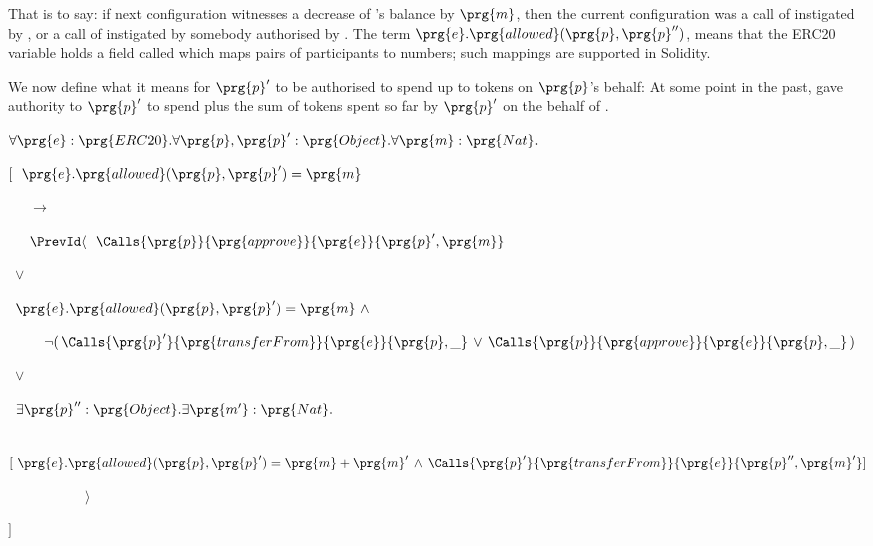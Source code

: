 \noindent
That is to say: if next configuration witnesses a decrease of 's balance by
 $\prg{m}$, then the current configuration was a call of  instigated by
 , or  a call of  instigated by somebody authorised by .
 The term $\prg{e}.\prg{allowed}(\prg{p},\prg{p}'')$,  means that the
ERC20 variable  holds a field called    which maps pairs of participants to numbers; such
mappings are supported in Solidity\cite{Solidity}.
 
We now define what it means for $\prg{p}'$ to be authorised  to  spend 
up to  tokens on  $\prg{p}$'s behalf: At some point in the
past,   gave authority to $\prg{p}'$  to spend   
plus the sum of  tokens
spent so far by $\prg{p}' $ on the behalf of . 

 
\vspace{.15cm}
\noindent
 $\forall \prg{e}:\prg{ERC20}.\forall \prg{p},\prg{p}^\prime:\prg{Object}.\forall \prg{m}:\prg{Nat}.$\\
\strut \hspace{0.3cm} $[\ \ \prg{e}.\prg{allowed}(\prg{p},\prg{p}')=\prg{m} $\\
\strut \hspace{0.4cm} \ \ \ $\longrightarrow$\\
\strut \hspace{0.4cm} \ \ \  
     $\PrevId\langle\ \  \Calls{\prg{p}}  {\prg{approve}}  {\prg{e}} {\prg{p}',\prg{m}} $\\
      \strut \hspace{1.7cm} \ $\vee $\\
\strut \hspace{1.7cm} \  
     $    \prg{e}.\prg{allowed}(\prg{p},\prg{p}')=\prg{m}   
        \  \wedge\ $\\
\strut \hspace{1.5cm} \ \ \ \ \          
$  \neg   (\, {\Calls{\prg{p}'} {\prg{transferFrom}} {\prg{e}} {\prg{p},\_}   } \, \vee \, {\Calls{\prg{p}} {\prg{approve}} {\prg{e}} {\prg{p},\_} } \, ) $\\
      \strut \hspace{1.7cm}\  $\vee $\\
\strut \hspace{1.7cm}   \  $ \exists \prg{p}'':\prg{Object}.\exists\prg{m'}:\prg{Nat}.$\\
 \strut \hspace{1.7cm}\  $[\   
  \prg{e}.\prg{allowed}(\prg{p},\prg{p}')=\prg{m}+\prg{m}'  \, \wedge\,   {\Calls{\prg{p}'} {\prg{transferFrom}} {\prg{e}} {\prg{p}'',\prg{m}'}  }   ]$\\
\strut \hspace{0.4cm} \ \ \  \ \ \  \ \ \ \ \ $\rangle $\\
\strut \hspace{0.3cm} $]$
\vspace{.15cm}
 
